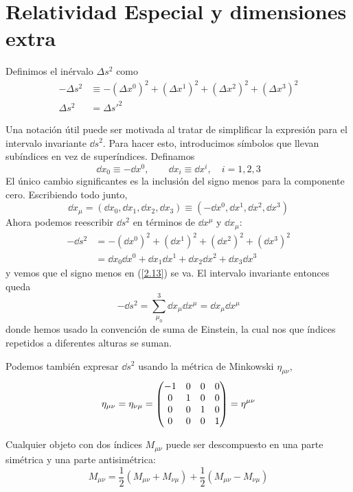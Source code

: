 \section{Relatividad Especial y dimensiones extra}
Definimos el inérvalo $\Delta s^2$ como
\begin{align}
   \label{2.13} -\Delta s^2&\equiv -(\Delta x^0)^2+(\Delta x^1)^2+(\Delta x^2)^2+(\Delta x^3)^2\\
    \Delta s^2&=\Delta s'^2
\end{align}

Una notación útil puede ser motivada al tratar de simplificar la expresión para el intervalo invariante $\dd s^2$. Para hacer esto, introducimos símbolos que llevan subíndices en vez de superíndices. Definamos
\begin{equation}
    \dd x_0\equiv -\dd x^0,\qquad \dd x_{i}\equiv\dd x^{i},\quad i=1,2,3
\end{equation}
El único cambio significantes es la inclusión del signo menos para la componente cero. Escribiendo todo junto,
\begin{equation}
    \dd x_\mu=(\dd x_0,\dd x_1,\dd x_2,\dd x_3)\equiv(-\dd x^0,\dd x^1,\dd x^2,\dd x^3)
\end{equation}
Ahora podemos reescribir $\dd s^2$ en términos de $\dd x^\mu$ y $\dd x_\mu$:
\begin{align}
    -\dd s^2&=-(\dd x^0)^2+(\dd x^1)^2+(\dd x^2)^2+(\dd x^3)^2\\
    &=\dd x_0\dd x^0+\dd x_1\dd x^1+\dd x_2\dd x^2+\dd x_3\dd x^3
\end{align}
y vemos que el signo menos en (\ref{2.13}) se va. El intervalo invariante entonces queda
\begin{equation}
    -\dd s^2=\sum_{\mu_0}^3\dd x_\mu \dd x^\mu=\dd x_\mu\dd x^\mu
\end{equation}
donde hemos usado la convención de suma de Einstein, la cual nos que índices repetidos a diferentes alturas se suman.

Podemos también expresar $\dd s^2$ usando la métrica de Minkowski $\eta_{\mu\nu}$,
\begin{equation}
    \eta_{\mu\nu}=\eta_{\nu\mu}=\mqty(\dmat[0]{-1,1,1,1})=\eta^{\mu\nu}
\end{equation}

Cualquier objeto con dos índices $M_{\mu\nu}$ puede ser descompuesto en una parte simétrica y una parte antisimétrica:
\begin{equation}
    M_{\mu\nu}=\frac{1}{2}(M_{\mu\nu}+M_{\nu\mu})+\frac{1}{2}(M_{\mu\nu}-M_{\nu\mu})
\end{equation}

